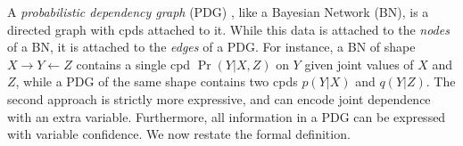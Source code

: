 \documentclass[twoside]{article}
\theoremstyle{plain}
\theoremstyle{definition}
\newcommand{\ed}[3]{#2%
		  \overset{\smash{\mskip-5mu\raisebox{-1pt}{$\scriptscriptstyle
		        #1$}}}{\rightarrow} #3}
\begin{document}
A \emph{probabilistic dependency graph} (PDG)
\parencite{richardson2020probabilistic}, like a Bayesian Network (BN), is a
directed graph with cpds attached to it. While this data is attached
to the \emph{nodes} of a BN, it is attached to the \emph{edges} of a PDG.
%
For instance, a BN of shape
$ X \!\to\! Y \!\leftarrow\! Z $
contains a single cpd $\Pr(Y | X,Z)$ on $Y$ given joint values of $X$ and $Z$,
while a PDG of the same shape contains two cpds $p(Y | X)$ and $q(Y | Z)$.
The second approach is strictly more expressive, and can encode joint dependence with an extra variable.
Furthermore, all information in a PDG can be expressed with variable confidence.
We now restate the formal definition.
\end{document}
